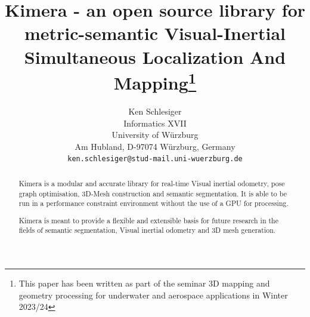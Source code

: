 \documentclass[11pt,a4paper]{article}
\begin{document}
\title{\Large\bf Kimera - an open source library for metric-semantic Visual-Inertial Simultaneous Localization And Mapping\footnote{This paper has been written as part of the seminar 3D mapping and geometry processing for underwater and aerospace applications in Winter 2023/24}}

\author{Ken Schlesiger\\
  Informatics XVII \\
  University of Würzburg\\
  Am Hubland, D-97074 Würzburg, Germany\\
{\small \texttt{ken.schlesiger@stud-mail.uni-wuerzburg.de}}}

\date{}

\maketitle

\newpage
\begin{abstract}
    
Kimera is a modular and accurate library for real-time Visual inertial odometry, pose graph optimisation, 3D-Mesh construction and semantic segmentation.
It is able to be run in a performance constraint environment without the use of a GPU for processing. 


Kimera is meant to provide a flexible and extensible basis for future research in the fields of semantic segmentation, Visual inertial odometry and 3D mesh generation.
\end{abstract}
\end{document}
